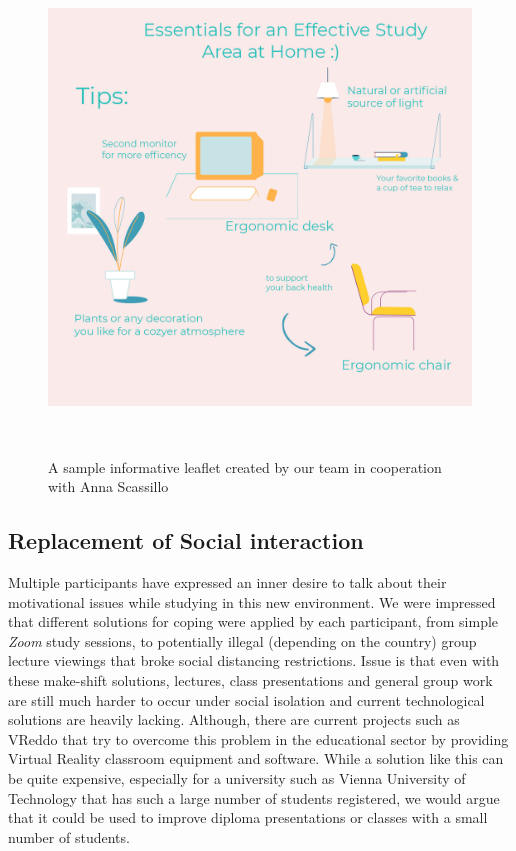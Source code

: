 \documentclass{sigchi}
\begin{document}
\begin{figure}
\centering
  \includegraphics[width=1\columnwidth]{figures/leaflet.png}
  \caption{A sample informative leaflet created by our team in cooperation with Anna Scassillo}~\label{fig:figure4}
\end{figure}

\subsection{Replacement of Social interaction}

Multiple participants have expressed an inner desire to talk about their motivational issues while studying in this new environment. We were impressed that different solutions for coping were applied by each participant, from simple \emph{Zoom} study sessions, to potentially illegal (depending on the country) group lecture viewings that broke social distancing restrictions. Issue is that even with these make-shift solutions, lectures, class presentations and general group work are still much harder to occur under social isolation and current technological solutions are heavily lacking. Although, there are current projects such as VReddo \cite{vreddo_2020} that try to overcome this problem in the educational sector by providing Virtual Reality classroom equipment and software. While a solution like this can be quite expensive, especially for a university such as Vienna University of Technology that has such a large number of students registered, we would argue that it could be used to improve diploma presentations or classes with a small number of students.
\end{document}

